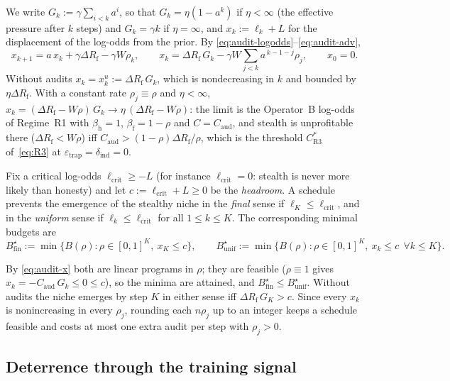 We write $G_k:=\gamma\sum_{i<k}a^i$, so that $G_k=\eta(1-a^k)$ if $\eta<\infty$ (the effective pressure after $k$ steps)
and $G_k=\gamma k$ if $\eta=\infty$, and $x_k:=\ell_k+L$ for the displacement of
the log-odds from the prior. By \eqref{eq:audit-logodds}--\eqref{eq:audit-adv},
\begin{equation}\label{eq:audit-x}
  x_{k+1}=a\,x_k+\gamma\Delta R_{\mathrm f}-\gamma W\rho_k,\qquad
  x_k=\Delta R_{\mathrm f}\,G_k-\gamma W\sum_{j<k}a^{\,k-1-j}\rho_j,\qquad x_0=0 .
\end{equation}
Without audits $x_k=x^{u}_k:=\Delta R_{\mathrm f}\,G_k$, which is nondecreasing in $k$ and
bounded by $\eta\Delta R_{\mathrm f}$. With a constant rate $\rho_j\equiv\rho$ and
$\eta<\infty$, $x_k=(\Delta R_{\mathrm f}-W\rho)\,G_k\to\eta\,(\Delta R_{\mathrm f}-W\rho)$:
the limit is the Operator~B log-odds of Regime~R1 with $\beta_{\mathrm h}=1$,
$\beta_{\mathrm f}=1-\rho$ and $C=C_{\mathrm{aud}}$, and stealth is unprofitable
there ($\Delta R_{\mathrm f}<W\rho$) iff
$C_{\mathrm{aud}}>(1-\rho)\Delta R_{\mathrm f}/\rho$, which is the threshold
$C^*_{\mathrm{R3}}$ of~\eqref{eq:R3} at
$\varepsilon_{\mathrm{trap}}=\delta_{\mathrm{ind}}=0$.

\begin{definition}\label{def:audit-budgets}
Fix a critical log-odds $\ell_{\mathrm{crit}}\ge -L$ (for instance
$\ell_{\mathrm{crit}}=0$: stealth is never more likely than honesty) and let
$c:=\ell_{\mathrm{crit}}+L\ge0$ be the \emph{headroom}. A schedule prevents the
emergence of the stealthy niche in the \emph{final} sense if
$\ell_K\le\ell_{\mathrm{crit}}$, and in the \emph{uniform} sense if
$\ell_k\le\ell_{\mathrm{crit}}$ for all $1\le k\le K$. The corresponding minimal
budgets are
\[
  B^\star_{\mathrm{fin}}:=\min\{B(\rho):\rho\in[0,1]^K,\ x_K\le c\},\qquad
  B^\star_{\mathrm{unif}}:=\min\{B(\rho):\rho\in[0,1]^K,\ x_k\le c\ \ \forall k\le K\}.
\]
\end{definition}
By \eqref{eq:audit-x} both are linear programs in $\rho$; they are feasible
($\rho\equiv1$ gives $x_k=-C_{\mathrm{aud}}\,G_k\le0\le c$), so the minima are attained, and
$B^\star_{\mathrm{fin}}\le B^\star_{\mathrm{unif}}$. Without audits the niche
emerges by step $K$ in either sense iff $\Delta R_{\mathrm f}\,G_K>c$. Since every $x_k$ is
nonincreasing in every $\rho_j$, rounding each $n\rho_j$ up to an integer keeps
a schedule feasible and costs at most one extra audit per step with $\rho_j>0$.

\subsection{Deterrence through the training signal}


